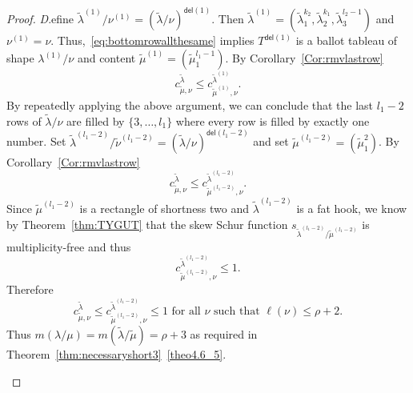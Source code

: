 \documentclass[ALCO,ThmDefs,Unicode,epreuves]{cedram}
\newcommand{\del}{\mathsf{del}}
\newenvironment{Case}[1]{\par\vskip2pt\noindent%
\emph{#1}.}{\vskip2pt}
\begin{document}
\begin{proof}
\begin{Case}
Define $\tilde \lambda^{(1)}/ \nu^{(1)} = (\tilde \lambda / \nu)^{\del (1)}$. Then $\tilde\lambda^{(1)} = (\tilde\lambda_1^{k_2},\tilde\lambda_2^{k_1},\tilde\lambda_3^{l_2-1})$ and $\nu^{(1)} = \nu$. Thus,~\eqref{eq:bottomrowallthesame} implies $T^{\del (1)}$ is a ballot tableau of shape $\lambda^{(1)}/\nu$ and content $\tilde \mu^{(1)} = (\tilde\mu_1^{l_1-1})$. By Corollary~\ref{Cor:rmvlastrow}
\[
c^{\tilde\lambda}_{\tilde\mu,\nu} \leq c^{\tilde\lambda^{(1)}}_{\tilde\mu^{(1)},\nu}.
\]
By repeatedly applying the above argument, we can conclude that the last $l_1-2$ rows of $\tilde\lambda/\nu$ are filled by $\{3,\ldots,l_1\}$ where every row is filled by exactly one number. Set $\tilde \lambda^{(l_1-2)} / \tilde \nu^{(l_1-2)} = (\tilde \lambda / \nu)^{\del (l_1-2)}$ and set $\tilde\mu^{(l_1-2)} = (\tilde \mu_1^2)$. By Corollary~\ref{Cor:rmvlastrow}
\[
c^{\tilde\lambda}_{\tilde\mu,\nu}\leq c^{\tilde \lambda^{(l_1-2)}}_{\tilde \mu^{(l_1-2)},\nu}.
\]
Since $\tilde\mu^{(l_1-2)}$ is a rectangle of shortness two and $\tilde \lambda^{(l_1-2)}$ is a fat hook, we know by Theorem~\ref{thm:TYGUT} that the skew Schur function $s_{\tilde\lambda^{(l_1-2)}/\tilde\mu^{(l_1-2)}}$ is multiplicity-free and thus
\[
c^{\tilde \lambda^{(l_1-2)}}_{\tilde \mu^{(l_1-2)},\nu} \leq 1.
\]
Therefore 
\[
c^{\tilde\lambda}_{\tilde\mu,\nu} \leq c^{\tilde \lambda^{(l_1-2)}}_{\tilde \mu^{(l_1-2)},\nu} \leq 1 \text{ for all }\nu\text{ such that }\ell(\nu)\leq \rho+2.
\]
Thus $m(\lambda/\mu) = m(\tilde\lambda/\tilde\mu) = \rho+3$ as required in Theorem~\ref{thm:necessaryshort3}~\ref{theo4.6_5}.


\begin{figure}[b]\centering
\end{figure}
\end{Case}
\end{proof}
\end{document}
